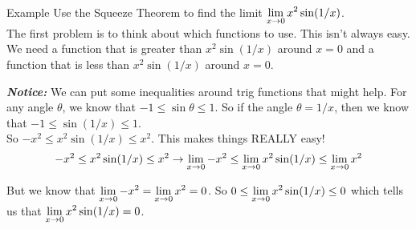 \newpage
\begin{note}{Example}
Use the Squeeze Theorem to find the limit $\displaystyle \lim_{x\to 0} x^2\sin(1/x)$.\\

The first problem is to think about which functions to use. This isn't always easy. We need a function that is greater than $x^2\sin(1/x)$ around $x=0$ and a function that is less than $x^2\sin(1/x)$ around $x=0$.

\textbf{\textit{Notice:}} We can put some inequalities around trig functions that might help. For any angle $\theta$, we know that $-1\leq \sin \theta \leq 1$. So if the angle $\theta = 1/x$, then we know that $-1\leq \sin(1/x) \leq 1$.\\

So $-x^2 \leq x^2 \sin (1/x) \leq x^2$. This makes things REALLY easy!
\[-x^2 \leq x^2 \sin (1/x) \leq x^2 \to \displaystyle \lim_{x\to0} -x^2 \leq \displaystyle \lim_{x\to0} x^2 \sin (1/x) \leq \displaystyle \lim_{x\to0} x^2\]

But we know that $\displaystyle \lim_{x\to0} -x^2 = \displaystyle \lim_{x\to0} x^2 = 0$. So $0\leq \displaystyle \lim_{x\to0} x^2 \sin (1/x) \leq 0$ which tells us that $\displaystyle \lim_{x\to0} x^2 \sin (1/x)=0$.
\end{note}

